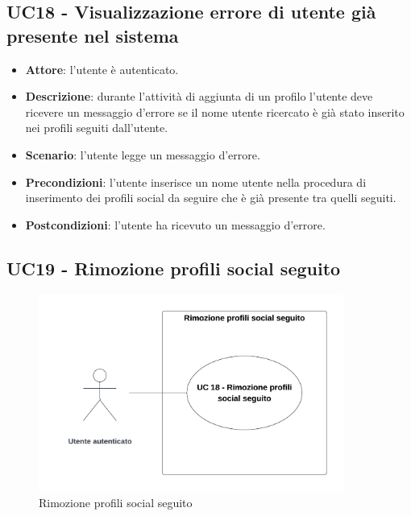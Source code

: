 \subsection{UC18 - Visualizzazione errore di utente già presente nel sistema}
\begin{itemize}
    \item \textbf{Attore}: l'utente è autenticato.
    \item \textbf{Descrizione}: durante l'attività di aggiunta di un profilo l'utente deve ricevere un messaggio d'errore se il nome utente ricercato è già stato inserito nei profili seguiti dall'utente.
    \item \textbf{Scenario}: l'utente legge un messaggio d'errore. 
    \item \textbf{Precondizioni}: l'utente inserisce un nome utente nella procedura di inserimento dei profili social da seguire che è già presente tra quelli seguiti.
    \item \textbf{Postcondizioni}: l'utente ha ricevuto un messaggio d'errore.
\end{itemize}

\subsection{UC19 - Rimozione profili social seguito}

\begin{figure}[!h]
    \includegraphics[width=10cm]{sezioni/Images/UC18.png}
    \centering
    \caption{Rimozione profili social seguito}
\end{figure}

